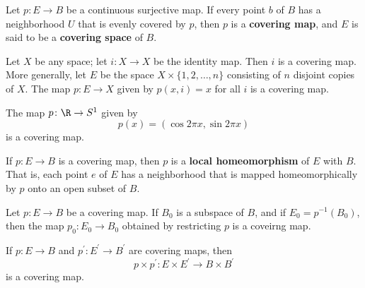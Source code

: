 \begin{definition}
Let $p\colon E \rightarrow B$ be a continuous surjective map. If every point $b$ of $B$ has a neighborhood $U$ that is evenly covered by $p$, then $p$ is a \textbf{covering map},
and $E$ is said to be a \textbf{covering space} of $B$.
\end{definition}

\begin{eg}
Let $X$ be any space; let $i\colon X \rightarrow X$ be the identity map. Then $i$ is a covering map. \\

More generally, let $E$ be the space $X \times \{ 1, 2, \dots, n \}$ consisting of $n$ disjoint copies of $X$. The map $p\colon E \rightarrow X$ given by $p(x, i) = x$ 
for all $i$ is a covering map.
\end{eg}

\begin{theorem}
The map $p\colon \R \rightarrow S^1$ given by 
\[
    p(x) = (\cos 2\pi x, \sin 2\pi x)
\]
is a covering map.
\end{theorem}

\begin{definition}
If $p\colon E \rightarrow B$ is a covering map, then $p$ is a \textbf{local homeomorphism} of $E$ with $B$. \\

That is, each point $e$ of $E$ has a neighborhood that is mapped homeomorphically by $p$ onto an open subset of $B$.
\end{definition}

\begin{theorem}
Let $p\colon E \rightarrow B$ be a covering map. If $B_0$ is a subspace of $B$, and if $E_0 = p^{-1}(B_0)$, then the map $p_0\colon E_0 \rightarrow B_0$ obtained by
restricting $p$ is a coveirng map.
\end{theorem}

\begin{theorem}
If $p\colon E \rightarrow B$ and $p^{\prime}\colon E^{\prime} \rightarrow B^{\prime}$ are covering maps, then
\[
    p \times p^{\prime} \colon E \times E^{\prime} \rightarrow B \times B^{\prime}
\]
is a covering map.
\end{theorem}


